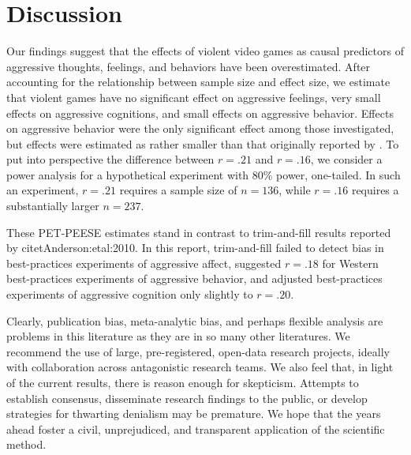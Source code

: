 \documentclass[man]{apa6}
\begin{document}
\section{Discussion}
Our findings suggest that the effects of violent video games as causal predictors of aggressive thoughts, feelings, and behaviors have been overestimated. After accounting for the relationship between sample size and effect size, we estimate that violent games have no significant effect on aggressive feelings, very small effects on aggressive cognitions, and small effects on aggressive behavior. Effects on aggressive behavior were the only significant effect among those investigated, but effects were estimated as rather smaller than that originally reported by \citet{Anderson:etal:2010}. To put into perspective the difference between $r = .21$ and $r = .16$, we consider a power analysis for a hypothetical experiment with 80\% power, one-tailed. In such an experiment, $r = .21$ requires a sample size of $n = 136$, while $r = .16$ requires a substantially larger $n = 237$. %



These PET-PEESE estimates stand in contrast to trim-and-fill results reported by citet{Anderson:etal:2010}. In this report, trim-and-fill failed to detect bias in best-practices experiments of aggressive affect, suggested $r = .18$ for Western best-practices experiments of aggressive behavior, and adjusted best-practices experiments of aggressive cognition only slightly to $r = .20$.

Clearly, publication bias, meta-analytic bias, and perhaps flexible analysis are problems in this literature as they are in so many other literatures. We recommend the use of large, pre-registered, open-data research projects, ideally with collaboration across antagonistic research teams. We also feel that, in light of the current results, there is reason enough for skepticism. Attempts to establish consensus, disseminate research findings to the public, or develop strategies for thwarting denialism may be premature. We hope that the years ahead foster a civil, unprejudiced, and transparent application of the scientific method. 
\end{document}
